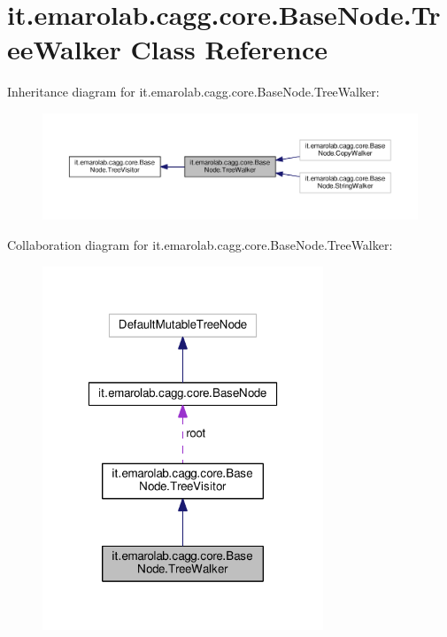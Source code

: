 \hypertarget{classit_1_1emarolab_1_1cagg_1_1core_1_1BaseNode_1_1TreeWalker}{\section{it.\-emarolab.\-cagg.\-core.\-Base\-Node.\-Tree\-Walker Class Reference}
\label{classit_1_1emarolab_1_1cagg_1_1core_1_1BaseNode_1_1TreeWalker}
}


Inheritance diagram for it.\-emarolab.\-cagg.\-core.\-Base\-Node.\-Tree\-Walker\-:\nopagebreak
\begin{figure}[H]
\begin{center}
\leavevmode
\includegraphics[width=350pt]{classit_1_1emarolab_1_1cagg_1_1core_1_1BaseNode_1_1TreeWalker__inherit__graph}
\end{center}
\end{figure}


Collaboration diagram for it.\-emarolab.\-cagg.\-core.\-Base\-Node.\-Tree\-Walker\-:\nopagebreak
\begin{figure}[H]
\begin{center}
\leavevmode
\includegraphics[width=238pt]{classit_1_1emarolab_1_1cagg_1_1core_1_1BaseNode_1_1TreeWalker__coll__graph}
\end{center}
\end{figure}
